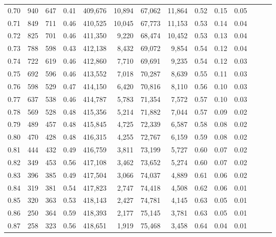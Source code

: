 \begin{tabular}{rrrrrrrrrrrrrr}
0.70 &     940 &    647 &  0.41 &  409,676 &   10,894 &  67,062 &  11,864 &  0.52 &  0.15 &      0.05 \\
0.71 &     849 &    711 &  0.46 &  410,525 &   10,045 &  67,773 &  11,153 &  0.53 &  0.14 &      0.04 \\
0.72 &     825 &    701 &  0.46 &  411,350 &    9,220 &  68,474 &  10,452 &  0.53 &  0.13 &      0.04 \\
0.73 &     788 &    598 &  0.43 &  412,138 &    8,432 &  69,072 &   9,854 &  0.54 &  0.12 &      0.04 \\
0.74 &     722 &    619 &  0.46 &  412,860 &    7,710 &  69,691 &   9,235 &  0.54 &  0.12 &      0.03 \\
0.75 &     692 &    596 &  0.46 &  413,552 &    7,018 &  70,287 &   8,639 &  0.55 &  0.11 &      0.03 \\
0.76 &     598 &    529 &  0.47 &  414,150 &    6,420 &  70,816 &   8,110 &  0.56 &  0.10 &      0.03 \\
0.77 &     637 &    538 &  0.46 &  414,787 &    5,783 &  71,354 &   7,572 &  0.57 &  0.10 &      0.03 \\
0.78 &     569 &    528 &  0.48 &  415,356 &    5,214 &  71,882 &   7,044 &  0.57 &  0.09 &      0.02 \\
0.79 &     489 &    457 &  0.48 &  415,845 &    4,725 &  72,339 &   6,587 &  0.58 &  0.08 &      0.02 \\
0.80 &     470 &    428 &  0.48 &  416,315 &    4,255 &  72,767 &   6,159 &  0.59 &  0.08 &      0.02 \\
0.81 &     444 &    432 &  0.49 &  416,759 &    3,811 &  73,199 &   5,727 &  0.60 &  0.07 &      0.02 \\
0.82 &     349 &    453 &  0.56 &  417,108 &    3,462 &  73,652 &   5,274 &  0.60 &  0.07 &      0.02 \\
0.83 &     396 &    385 &  0.49 &  417,504 &    3,066 &  74,037 &   4,889 &  0.61 &  0.06 &      0.02 \\
0.84 &     319 &    381 &  0.54 &  417,823 &    2,747 &  74,418 &   4,508 &  0.62 &  0.06 &      0.01 \\
0.85 &     320 &    363 &  0.53 &  418,143 &    2,427 &  74,781 &   4,145 &  0.63 &  0.05 &      0.01 \\
0.86 &     250 &    364 &  0.59 &  418,393 &    2,177 &  75,145 &   3,781 &  0.63 &  0.05 &      0.01 \\
0.87 &     258 &    323 &  0.56 &  418,651 &    1,919 &  75,468 &   3,458 &  0.64 &  0.04 &      0.01 \\

\end{tabular}
